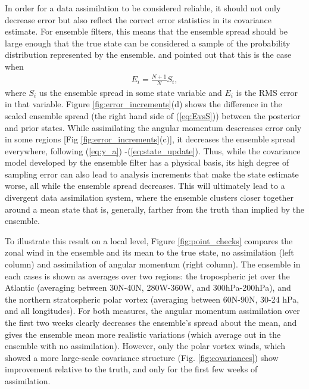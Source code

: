 In order for a data assimilation to be considered reliable, it should not only 
decrease error but also reflect the correct error statistics in its covariance 
estimate. 
For ensemble filters, this means that the ensemble spread should be large 
enough that the true state can be considered  a sample of the probability 
distribution represented by the ensemble.
 \citet{Huntley2009} and \citet{Murphy1988} pointed out that this is the case when 
 \begin{eqnarray}
	 E_i = \frac{N+1}{N} S_i, 
	 \label{eq:EvsS}
 \end{eqnarray}
where $S_i$ us the ensemble spread in some state variable and $E_i$ is the RMS error in that variable. 
Figure \ref{fig:error_increments}(d) shows the difference in the scaled ensemble spread (the right hand side of (\ref{eq:EvsS})) between the posterior and prior states. 
While assimilating the angular momentum descreases error only in some regions [Fig \ref{fig:error_increments}(c)], it decreases the ensemble spread everywhere, 
following (\ref{eq:y_a}) -(\ref{eq:state_update}).  
Thus, while the covariance model developed by the ensemble filter has a physical basis, its high degree of sampling error can also lead to analysis increments that make the state estimate worse, all while the ensemble spread decreases.  
This will ultimately lead to a divergent data assimilation system, where the ensemble clusters closer together around a mean state that is, generally, farther from the truth than implied by the ensemble. 


To illustrate this result on a local level, Figure \ref{fig:point_checks} compares the zonal wind in the ensemble and its mean to the true state, no assimilation (left column) and assimilation of angular momentum (right column). 
The ensemble in each cases is shown as averages over two regions: the tropospheric jet over the Atlantic (averaging between 30N-40N, 280W-360W, and 300hPa-200hPa), and the northern stratospheric polar vortex (averaging between 60N-90N, 30-24 hPa, and all longitudes).
For both measures, the angular momentum assimilation over the first two weeks clearly decreases the ensemble's spread about the mean, and gives the ensemble mean more realistic variations (which average out in the ensemble with no assimilation). 
However, only the polar vortex winds, which showed a more large-scale covariance structure (Fig. \ref{fig:covariances}) show improvement relative to the truth, and only for the first few weeks of assimilation. 

